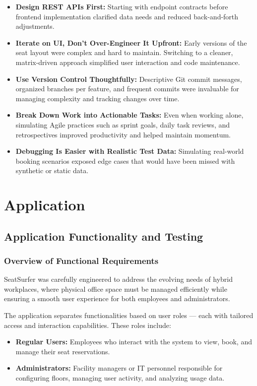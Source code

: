 \documentclass[12pt,a4paper]{report} %
\begin{document}
\begin{itemize}
\item \textbf{Design REST APIs First:}
Starting with endpoint contracts before frontend implementation clarified data needs and reduced back-and-forth adjustments.
\item \textbf{Iterate on UI, Don’t Over-Engineer It Upfront:}  
Early versions of the seat layout were complex and hard to maintain. Switching to a cleaner, matrix-driven approach simplified user interaction and code maintenance.
\item \textbf{Use Version Control Thoughtfully:}  
Descriptive Git commit messages, organized branches per feature, and frequent commits were invaluable for managing complexity and tracking changes over time.
\item \textbf{Break Down Work into Actionable Tasks:}  
Even when working alone, simulating Agile practices such as sprint goals, daily task reviews, and retrospectives improved productivity and helped maintain momentum.
\item \textbf{Debugging Is Easier with Realistic Test Data:}  
Simulating real-world booking scenarios exposed edge cases that would have been missed with synthetic or static data.
\end{itemize}

\newpage

\chapter{Application}
\section{Application Functionality and Testing}

\subsection{Overview of Functional Requirements}

SeatSurfer was carefully engineered to address the evolving needs of hybrid workplaces, where physical office space must be managed efficiently while ensuring a smooth user experience for both employees and administrators.

The application separates functionalities based on user roles — each with tailored access and interaction capabilities. These roles include:

\begin{itemize}
    \item \textbf{Regular Users:} Employees who interact with the system to view, book, and manage their seat reservations.
    \item \textbf{Administrators:} Facility managers or IT personnel responsible for configuring floors, managing user activity, and analyzing usage data.
\end{itemize}
\end{document}
